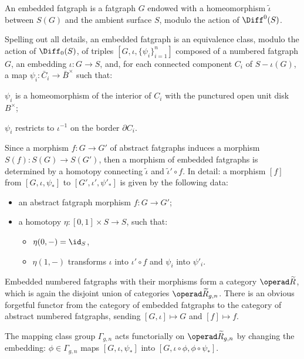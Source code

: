 \begin{definition}\label{dfn:embedded-rg}
  An embedded fatgraph is a fatgraph $G$ endowed with a
  homeomorphism ${\tilde \iota}$ between $S(G)$ and the ambient
  surface $S$, modulo the action of $\Diff^0(S)$.
\end{definition}
Spelling out all details, an embedded fatgraph is an equivalence
class, modulo the action of $\Diff_0(S)$, of triples $[G, \iota,
\{\psi_i\}_{i=1}^n]$ composed of a numbered fatgraph $G$, an
embedding $\iota:G\to S$, and, for each connected component $C_i$ of
$S - \iota(G)$, a map $\psi_i: {\bar C_i} \to {\bar B}^\times$ such
that:
\begin{inparaenum}[\slshape (1)]
\item $\psi_i$ is a homeomorphism of the interior of $C_i$ with the
  punctured open unit disk $B^\times$;
\item $\psi_i$ restricts to $\iota^{-1}$ on the border $\partial C_i$.
\end{inparaenum}

Since a morphism $f:G\to G'$ of abstract fatgraphs induces a morphism
$S(f):S(G)\to S(G')$, then a morphism of embedded fatgraphs is
determined by a homotopy connecting ${\tilde \iota}$ and ${\tilde
  \iota' \circ f}$.  In detail: a morphism $[f]$ from $[G, \iota,
\psi_*]$ to $[G', \iota', \psi'_*]$ is given by the following data:
\begin{itemize}
\item an abstract fatgraph morphism $f:G\to G'$;
\item a homotopy $\eta:[0,1] \times S\to S$, such that:
  \begin{itemize}
  \item $\eta(0,-) = \id_S$,
  \item $\eta(1,-)$ transforms $\iota$ into $\iota' \circ f$
    and $\psi_i$ into $\psi'_i$.
  \end{itemize}

\end{itemize}

Embedded numbered fatgraphs with their morphisms form a category
$\ERG$, which is again the disjoint union of categories $\ERG_{g,n}$.
There is an obvious forgetful functor from the category of embedded
fatgraphs to the category of abstract numbered fatgraphs,
sending $[G, \iota] \mapsto G$ and $[f] \mapsto f$.

The mapping class group $\Gamma_{g,n}$ acts functorially on
$\ERG_{g,n}$ by changing the embedding: $\phi \in \Gamma_{g,n}$ maps
$[G, \iota, \psi_*]$ into $[G, \iota \circ \phi, \phi \circ \psi_*]$.


